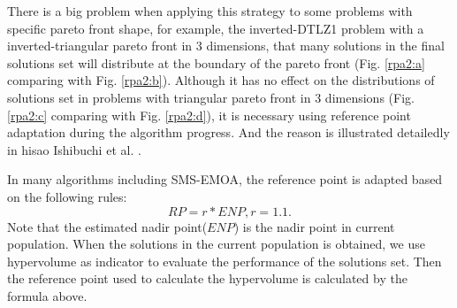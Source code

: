 \documentclass[conference]{IEEEtran}
\begin{document}
There is a big problem when applying this strategy to some problems with specific pareto front shape, 
for example, the inverted-DTLZ1 problem with a inverted-triangular pareto front in 3 dimensions,
that many solutions in the final solutions set will distribute at the boundary of the pareto front
(Fig. \ref{rpa2:a} comparing with Fig. \ref{rpa2:b})\cite{hisao1,hisao2}. 
Although it has no effect on the distributions of solutions set 
in problems with triangular pareto front in 3 dimensions 
(Fig. \ref{rpa2:c} comparing with Fig. \ref{rpa2:d}), 
it is necessary using reference point adaptation during the algorithm progress.
And the reason is illustrated detailedly in hisao Ishibuchi et al. \cite{hisaos}. %

In many algorithms including SMS-EMOA\cite{smsemoa}, 
the reference point is adapted based on the following rules:
\begin{equation}\label{frpa1}
  RP = r * ENP, r = 1.1.
\end{equation}
Note that the estimated nadir point($ENP$) is the nadir point in current population.
When the solutions in the current population is obtained, 
we use hypervolume as indicator to evaluate the performance of the solutions set. 
Then the reference point used to calculate the hypervolume is calculated by the formula above.
\end{document}
